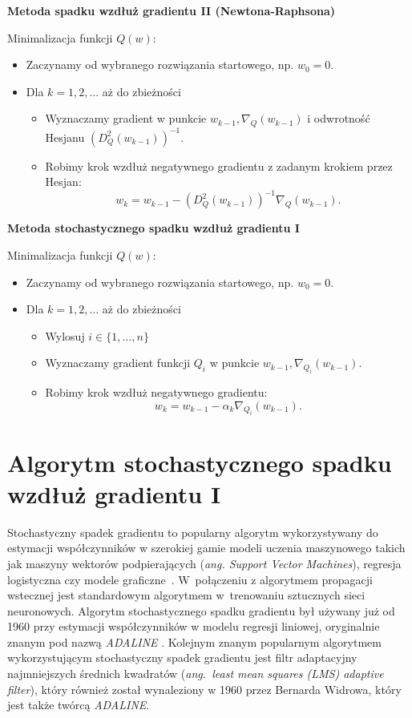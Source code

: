 \begin{center}
\textbf{Metoda spadku wzdłuż gradientu II (Newtona-Raphsona)}
\end{center}
Minimalizacja funkcji $Q(w)$:
\begin{itemize}
\item Zaczynamy od wybranego rozwiązania startowego, np. $w_{0} = 0$.
\item Dla $k = 1, 2, \dots$ aż do zbieżności
	\begin{itemize}
	\item Wyznaczamy gradient w punkcie $w_{k-1}, \nabla_{Q}(w_{k-1})$ i odwrotność Hesjanu $(D_{Q}^{2}(w_{k-1}))^{-1}$.
	\item Robimy krok wzdłuż negatywnego gradientu z zadanym krokiem przez Hesjan: $$w_{k} = w_{k-1} - (D_{Q}^{2}(w_{k-1}))^{-1}\nabla_{Q}(w_{k-1}). $$
	\end{itemize}
\end{itemize}
\begin{center}
\textbf{Metoda stochastycznego spadku wzdłuż gradientu I}
\end{center}
Minimalizacja funkcji $Q(w)$:
\begin{itemize}
\item Zaczynamy od wybranego rozwiązania startowego, np. $w_{0} = 0$.
\item Dla $k = 1, 2, \dots$ aż do zbieżności
	\begin{itemize}
	\item Wylosuj $i \in \{1,\dots,n\}$
	\item Wyznaczamy gradient funkcji $Q_{i}$ w punkcie $w_{k-1}, \nabla_{Q_{i}}(w_{k-1})$.
	\item Robimy krok wzdłuż negatywnego gradientu: 
	\begin{equation}\label{sgdrownanie}
	 w_{k} = w_{k-1} - \alpha_{k}\nabla_{Q_{i}}(w_{k-1}).
	  \end{equation}
	\end{itemize}
\end{itemize}

\section{Algorytm stochastycznego spadku wzdłuż gradientu I}\label{SGD}
Stochastyczny spadek gradientu to popularny algorytm wykorzystywany do estymacji współczynników w szerokiej gamie modeli uczenia maszynowego takich jak maszyny wektorów podpierających (\textit{ang. Support Vector Machines}), regresja logistyczna czy modele graficzne~\cite{finkel}. W~połączeniu z algorytmem propagacji wstecznej jest standardowym algorytmem w~trenowaniu sztucznych sieci neuronowych. Algorytm stochastycznego spadku gradientu był używany już od 1960 przy estymacji współczynników w modelu regresji liniowej, oryginalnie znanym pod nazwą \textit{ADALINE} \cite{ADALINE}. Kolejnym znanym popularnym algorytmem wykorzystującym stochastyczny spadek gradientu jest filtr adaptacyjny najmniejszych średnich kwadratów \cite{widrow2} (\textit{ang.~least mean squares (LMS) adaptive filter}), który również został wynaleziony w 1960 przez Bernarda Widrowa, który jest także twórcą \textit{ADALINE}.

